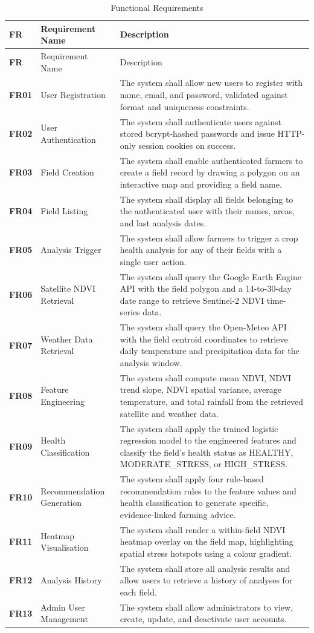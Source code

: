 \documentclass[12pt,a4paper]{report}
\begin{document}
\begin{longtable}{>{\bfseries}p{0.8cm} p{4cm} p{7cm}}
\caption{Functional Requirements}\label{tab:functional}\\
\toprule
FR & Requirement Name & Description \\
\midrule
\endfirsthead
\toprule
FR & Requirement Name & Description \\
\midrule
\endhead
\bottomrule
\endfoot
FR01 & User Registration & The system shall allow new users to register with name, email, and password, validated against format and uniqueness constraints. \\[4pt]
FR02 & User Authentication & The system shall authenticate users against stored bcrypt-hashed passwords and issue HTTP-only session cookies on success. \\[4pt]
FR03 & Field Creation & The system shall enable authenticated farmers to create a field record by drawing a polygon on an interactive map and providing a field name. \\[4pt]
FR04 & Field Listing & The system shall display all fields belonging to the authenticated user with their names, areas, and last analysis dates. \\[4pt]
FR05 & Analysis Trigger & The system shall allow farmers to trigger a crop health analysis for any of their fields with a single user action. \\[4pt]
FR06 & Satellite NDVI Retrieval & The system shall query the Google Earth Engine API with the field polygon and a 14-to-30-day date range to retrieve Sentinel-2 NDVI time-series data. \\[4pt]
FR07 & Weather Data Retrieval & The system shall query the Open-Meteo API with the field centroid coordinates to retrieve daily temperature and precipitation data for the analysis window. \\[4pt]
FR08 & Feature Engineering & The system shall compute mean NDVI, NDVI trend slope, NDVI spatial variance, average temperature, and total rainfall from the retrieved satellite and weather data. \\[4pt]
FR09 & Health Classification & The system shall apply the trained logistic regression model to the engineered features and classify the field's health status as HEALTHY, MODERATE\_STRESS, or HIGH\_STRESS. \\[4pt]
FR10 & Recommendation Generation & The system shall apply four rule-based recommendation rules to the feature values and health classification to generate specific, evidence-linked farming advice. \\[4pt]
FR11 & Heatmap Visualisation & The system shall render a within-field NDVI heatmap overlay on the field map, highlighting spatial stress hotspots using a colour gradient. \\[4pt]
FR12 & Analysis History & The system shall store all analysis results and allow users to retrieve a history of analyses for each field. \\[4pt]
FR13 & Admin User Management & The system shall allow administrators to view, create, update, and deactivate user accounts. \\[4pt]
\end{longtable}
\end{document}
